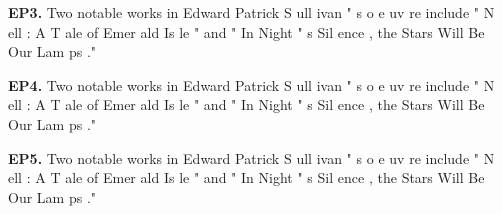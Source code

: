 \begin{mdframed}
\textbf{EP3.} \textcolor{Gray0}{Two} \textcolor{Gray0}{notable} \textcolor{Gray1}{works} \textcolor{Gray2}{in} \textcolor{Gray0}{Edward} \textcolor{Gray1}{Patrick} \textcolor{Gray4}{S} \textcolor{Gray6}{ull} \textcolor{Gray2}{ivan} \textcolor{Gray1}{"} \textcolor{Gray0}{s} \textcolor{Gray0}{o} \textcolor{Gray2}{e} \textcolor{Gray4}{uv} \textcolor{Gray7}{re} \textcolor{Gray1}{include} \textcolor{Gray0}{"} \textcolor{Gray1}{N} \textcolor{Gray9}{ell} \textcolor{Gray0}{:} \textcolor{Gray1}{A} \textcolor{Gray0}{T} \textcolor{Gray2}{ale} \textcolor{Gray0}{of} \textcolor{Gray0}{Emer} \textcolor{Gray7}{ald} \textcolor{Gray0}{Is} \textcolor{Gray9}{le} \textcolor{Gray2}{"} \textcolor{Gray3}{and} \textcolor{Gray2}{"} \textcolor{Gray0}{In} \textcolor{Gray6}{Night} \textcolor{Gray0}{"} \textcolor{Gray5}{s} \textcolor{Gray7}{Sil} \textcolor{Gray7}{ence} \textcolor{Gray3}{,} \textcolor{Gray5}{the} \textcolor{Gray6}{Stars} \textcolor{Gray7}{Will} \textcolor{Gray1}{Be} \textcolor{Gray0}{Our} \textcolor{Gray9}{Lam} \textcolor{Gray7}{ps} \textcolor{Gray2}{."} 

\textbf{EP4.} \textcolor{Gray0}{Two} \textcolor{Gray0}{notable} \textcolor{Gray1}{works} \textcolor{Gray1}{in} \textcolor{Gray0}{Edward} \textcolor{Gray0}{Patrick} \textcolor{Gray3}{S} \textcolor{Gray5}{ull} \textcolor{Gray1}{ivan} \textcolor{Gray0}{"} \textcolor{Gray0}{s} \textcolor{Gray0}{o} \textcolor{Gray2}{e} \textcolor{Gray3}{uv} \textcolor{Gray3}{re} \textcolor{Gray0}{include} \textcolor{Gray0}{"} \textcolor{Gray0}{N} \textcolor{Gray6}{ell} \textcolor{Gray0}{:} \textcolor{Gray1}{A} \textcolor{Gray0}{T} \textcolor{Gray1}{ale} \textcolor{Gray0}{of} \textcolor{Gray0}{Emer} \textcolor{Gray7}{ald} \textcolor{Gray0}{Is} \textcolor{Gray9}{le} \textcolor{Gray1}{"} \textcolor{Gray1}{and} \textcolor{Gray0}{"} \textcolor{Gray0}{In} \textcolor{Gray1}{Night} \textcolor{Gray0}{"} \textcolor{Gray2}{s} \textcolor{Gray6}{Sil} \textcolor{Gray4}{ence} \textcolor{Gray3}{,} \textcolor{Gray4}{the} \textcolor{Gray3}{Stars} \textcolor{Gray3}{Will} \textcolor{Gray0}{Be} \textcolor{Gray0}{Our} \textcolor{Gray7}{Lam} \textcolor{Gray6}{ps} \textcolor{Gray0}{."} 

\textbf{EP5.} \textcolor{Gray0}{Two} \textcolor{Gray0}{notable} \textcolor{Gray1}{works} \textcolor{Gray0}{in} \textcolor{Gray0}{Edward} \textcolor{Gray0}{Patrick} \textcolor{Gray1}{S} \textcolor{Gray3}{ull} \textcolor{Gray0}{ivan} \textcolor{Gray0}{"} \textcolor{Gray0}{s} \textcolor{Gray0}{o} \textcolor{Gray2}{e} \textcolor{Gray3}{uv} \textcolor{Gray2}{re} \textcolor{Gray0}{include} \textcolor{Gray0}{"} \textcolor{Gray0}{N} \textcolor{Gray3}{ell} \textcolor{Gray0}{:} \textcolor{Gray1}{A} \textcolor{Gray0}{T} \textcolor{Gray1}{ale} \textcolor{Gray0}{of} \textcolor{Gray0}{Emer} \textcolor{Gray6}{ald} \textcolor{Gray0}{Is} \textcolor{Gray9}{le} \textcolor{Gray1}{"} \textcolor{Gray1}{and} \textcolor{Gray0}{"} \textcolor{Gray0}{In} \textcolor{Gray1}{Night} \textcolor{Gray0}{"} \textcolor{Gray2}{s} \textcolor{Gray5}{Sil} \textcolor{Gray3}{ence} \textcolor{Gray2}{,} \textcolor{Gray3}{the} \textcolor{Gray1}{Stars} \textcolor{Gray2}{Will} \textcolor{Gray0}{Be} \textcolor{Gray0}{Our} \textcolor{Gray6}{Lam} \textcolor{Gray5}{ps} \textcolor{Gray0}{."}

\end{mdframed}